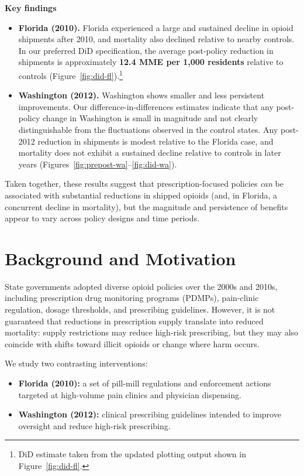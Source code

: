 \documentclass[11pt]{article}
\begin{document}
\textbf{Key findings}
\begin{itemize}[leftmargin=*]
    \item \textbf{Florida (2010).} Florida experienced a large and sustained decline in opioid shipments after 2010, and mortality also declined relative to nearby controls. In our preferred DiD specification, the average post-policy reduction in shipments is approximately \textbf{12.4 MME per 1{,}000 residents} relative to controls (Figure~\ref{fig:did-fl}).\footnote{DiD estimate taken from the updated plotting output shown in Figure~\ref{fig:did-fl}.}
    \item \textbf{Washington (2012).} Washington shows smaller and less persistent improvements. Our difference-in-differences estimates indicate that any post-policy change in Washington is small in magnitude and not clearly distinguishable from the fluctuations observed in the control states. Any post-2012 reduction in shipments is modest relative to the Florida case, and mortality does not exhibit a sustained decline relative to controls in later years (Figures~\ref{fig:prepost-wa}--\ref{fig:did-wa}).
\end{itemize}

Taken together, these results suggest that prescription-focused policies \emph{can} be associated with substantial reductions in shipped opioids (and, in Florida, a concurrent decline in mortality), but the magnitude and persistence of benefits appear to vary across policy designs and time periods.

\section{Background and Motivation}

State governments adopted diverse opioid policies over the 2000s and 2010s, including prescription drug monitoring programs (PDMPs), pain-clinic regulation, dosage thresholds, and prescribing guidelines. However, it is not guaranteed that reductions in prescription supply translate into reduced mortality: supply restrictions may reduce high-risk prescribing, but they may also coincide with shifts toward illicit opioids or change where harm occurs.

We study two contrasting interventions:
\begin{itemize}[leftmargin=*]
    \item \textbf{Florida (2010):} a set of pill-mill regulations and enforcement actions targeted at high-volume pain clinics and physician dispensing.
    \item \textbf{Washington (2012):} clinical prescribing guidelines intended to improve oversight and reduce high-risk prescribing.
\end{itemize}
\end{document}

